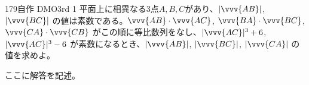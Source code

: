 \begin{thm}{179}{}{自作 DMO3rd 1}
 平面上に相異なる3点$A, B, C$があり、$|\vvv{AB}|$, $|\vvv{BC}|$ の値は素数である。$\vvv{AB}\cdot\vvv{AC}$, $\vvv{BA}\cdot\vvv{BC}$, $\vvv{CA}\cdot\vvv{CB}$ がこの順に等比数列をなし、$|\vvv{AC}|^3+6$, $|\vvv{AC}|^3-6$ が素数になるとき、$|\vvv{AB}|$, $|\vvv{BC}|$, $|\vvv{CA}|$ の値を求めよ。
\end{thm}

ここに解答を記述。